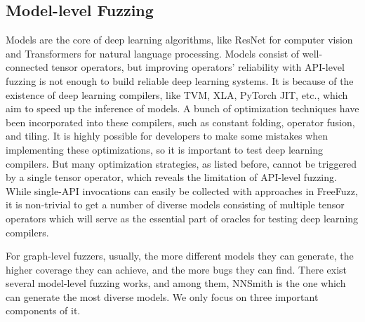\begin{survey}
\section{Model-level Fuzzing}

Models are the core of deep learning algorithms, like ResNet\cite{resnet} for computer vision and Transformers\cite{attention} for natural language processing. Models consist of well-connected tensor operators, but improving operators' reliability with API-level fuzzing is not enough to build reliable deep learning systems. It is because of the existence of deep learning compilers, like TVM\cite{tvm}, XLA\cite{xla}, PyTorch JIT\cite{ptjit}, etc., which aim to speed up the inference of models. A bunch of optimization techniques have been incorporated into these compilers, such as constant folding, operator fusion, and tiling. It is highly possible for developers to make some mistakes when implementing these optimizations\cite{emp_tf}, so it is important to test deep learning compilers. But many optimization strategies, as listed before, cannot be triggered by a single tensor operator, which reveals the limitation of API-level fuzzing. While single-API invocations can easily be collected with approaches in FreeFuzz, it is non-trivial to get a number of diverse models consisting of multiple tensor operators which will serve as the essential part of oracles for testing deep learning compilers.

For graph-level fuzzers, usually, the more different models they can generate, the higher coverage they can achieve, and the more bugs they can find. There exist several model-level fuzzing works\cite{cradle, lemon, graphfuzzer, muffin, nnsmith}, and among them, NNSmith\cite{nnsmith} is the one which can generate the most diverse models. We only focus on three important components of it.


\end{survey}
